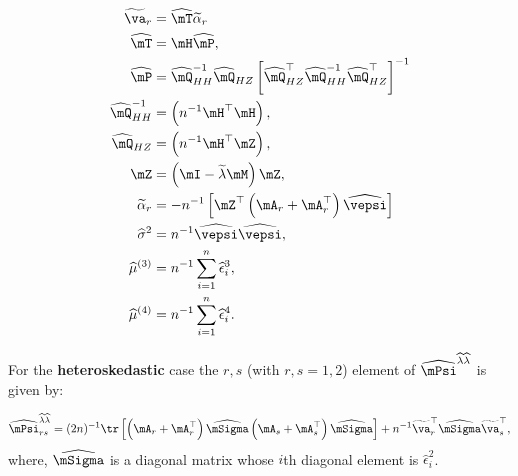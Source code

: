 \documentclass[english,12pt]{book}\usepackage[]{graphicx}\usepackage[]{xcolor}
\begin{document}
\begin{equation}
  \begin{aligned}
    \widetilde{\va}_r & = \widehat{\mT}\widetilde{\alpha}_r \\
    \widehat{\mT} & = \mH\widehat{\mP}, \\
    \widehat{\mP} & = \widehat{\mQ}_{HH}^{-1}\widehat{\mQ}_{HZ}\left[\widehat{\mQ}_{HZ}^\top\widehat{\mQ}_{HH}^{-1} \widehat{\mQ}_{HZ}^\top\right]^{-1} \\
    \widehat{\mQ}_{HH}^{-1} & = \left(n^{-1}\mH^\top\mH\right), \\
  \widehat{\mQ}_{HZ} & = \left(n^{-1}\mH^\top\mZ\right), \\
  \mZ & = \left(\mI - \widetilde{\lambda}\mM\right)\mZ, \\
  \widetilde{\alpha}_r & = - n^{-1}\left[\mZ^\top\left(\mA_r + \mA_r^\top\right)\widehat{\vepsi}\right] \\
  \widehat{\sigma}^2 & = n^{-1}\widehat{\vepsi}\widehat{\vepsi}, \\
  \widehat{\mu}^{(3)} & = n^{-1}\sum_{i = 1}^n\widehat{\epsilon}_i^3 , \\
  \widehat{\mu}^{(4)} & = n^{-1}\sum_{i = 1}^n\widehat{\epsilon}_i^4.
  \end{aligned}
\end{equation}

For the \textbf{heteroskedastic} case the $r, s$ (with $r,s = 1,2$) element of $\widehat{\mPsi}^{\widehat{\lambda}\widehat{\lambda}}$ is given by:

\begin{equation}
  \widehat{\mPsi}^{\widehat{\lambda}\widehat{\lambda}}_{rs} = (2n)^{-1}\tr\left[\left(\mA_r + \mA_r^\top\right)\widehat{\mSigma}\left(\mA_s + \mA_s^\top\right)\widehat{\mSigma}\right]  + n^{-1}\widetilde{\va}_r^\top\widehat{\mSigma}\widetilde{\va}_s^\top,
\end{equation}
%
where, $\widehat{\mSigma}$ is a diagonal matrix whose $i$th diagonal element is $\widehat{\epsilon}_i^2$. 




%
\end{document}
